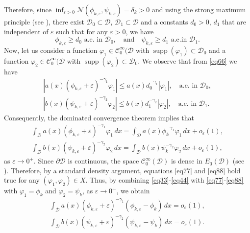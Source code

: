 \documentclass[10pt,a4paper]{amsart}
\numberwithin{equation}{section}
\begin{document}
Therefore, since 
$\inf_{\varepsilon>0} \mathcal{N}(\phi_{k,\varepsilon},\psi_{k,\varepsilon})=\delta_k>0$ 
and using the strong maximum principle (see \cite{max}), there exist 
$\mathcal{D}_0\subset \mathcal{D}$, $\mathcal{D}_1\subset \mathcal{D}$ and a constants 
$d_0>0$, $d_1$ that are independent of $\varepsilon$ such that for any $\varepsilon>0$, 
we have
\begin{equation}\label{eq66}
\phi_{k,\varepsilon}\geq d_0 \text{ a.e. in }  \mathcal{D}_0, \quad \text{and}\quad 
\psi_{k,\varepsilon}\geq d_1 \text{ a.e.in } \mathcal{D}_1.
\end{equation}
Now, let us consider a function $\varphi_1\in \mathcal{C}^\infty_0(\mathcal{D}$ with 
$\operatorname{supp}(\varphi_1)\subset \mathcal{D}_0$ and a function 
$\varphi_2\in \mathcal{C}^\infty_0(\mathcal{D}$ with 
$\operatorname{supp}(\varphi_2)\subset \mathcal{D}_0$.
 We observe that from \eqref{eq66} we have
\begin{gather*}
|a(x)(\phi_{k,\varepsilon}+\varepsilon)^{-\gamma_1}\varphi_1|
\leq a(x) d_0^{-\gamma_1}|\varphi_1|,\quad \text{a.e. in } \mathcal{D}_0,\\
|b(x)(\psi_{k,\varepsilon}+\varepsilon)^{-\gamma_2}\varphi_2|
\leq b(x) d_1^{-\gamma_2}|\varphi_2|,\quad \text{a.e. in } \mathcal{D}_1.
\end{gather*}
Consequently, the dominated convergence theorem implies that
\begin{gather}\label{eq77}
\int_\mathcal{D}a(x) (\phi_{k,\varepsilon}+\varepsilon)^{-\gamma_1}\varphi_1\,dx
=\int_\mathcal{D}a(x) \phi_{k}^{-\gamma_1}\varphi_1\,dx+o_\varepsilon(1), \\
\label{eq88}
\int_\mathcal{D}b(x) (\psi_{k,\varepsilon}+\varepsilon)^{-\gamma_2}\varphi_2\,dx
=\int_\mathcal{D}b(x) \psi_{k}^{-\gamma_2}\varphi_2\,dx+o_\varepsilon(1),
\end{gather}
as $\varepsilon\to0^+$. Since $\partial\mathcal{D}$ is continuous, the space 
$\mathcal{C}^\infty_0(\mathcal{D})$ is dense in $E_0(\mathcal{D})$ 
(see \cite[Theorem 6]{density}). 
Therefore, by a standard density argument, equations \eqref{eq77} and \eqref{eq88}
hold true for any $(\varphi_1,\varphi_2)\in X$. Thus, by combining 
\eqref{eq33}-\eqref{eq44} with \eqref{eq77}-\eqref{eq88} with $\varphi_1=\phi_k$ and 
$\varphi_2=\psi_k$, as $\varepsilon\to0^+$, we obtain
\begin{gather*}
\int_\mathcal{D}a(x) (\phi_{k,\varepsilon}+\varepsilon)^{-\gamma_1}
(\phi_{k,\varepsilon}-\phi_k)\,dx=o_\varepsilon(1), \\
\int_\mathcal{D}b(x) (\psi_{k,\varepsilon}+\varepsilon)^{-\gamma_2}(\psi_{k,\varepsilon}
-\psi_k)\,dx=o_\varepsilon(1).
\end{gather*}
\end{document}
